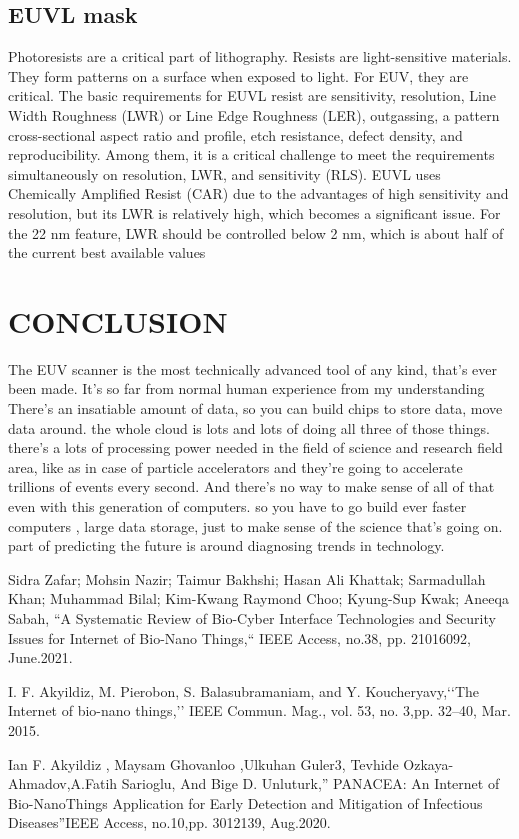 \documentclass[12pt,a4paper]{report}
\begin{document}
\section{EUVL mask}

Photoresists are a critical part of lithography. Resists are 
light-sensitive materials. 
They form patterns on a surface when exposed to light. For EUV, 
they are critical.
The basic requirements for EUVL resist are sensitivity, 
resolution, Line Width Roughness 
(LWR) or Line Edge Roughness (LER), outgassing, a pattern 
cross-sectional aspect ratio 
and profile, etch resistance, defect density, and 
reproducibility. Among them, 
it is a critical challenge to meet the requirements 
simultaneously on resolution, 
LWR, and sensitivity (RLS). EUVL uses Chemically Amplified 
Resist (CAR) due to 
the advantages of high sensitivity and resolution, but its 
LWR is relatively high, 
which becomes a significant issue. For the 22 nm feature, 
LWR should be 
controlled below 2 nm, which is about half of the current 
best available values



\chapter{CONCLUSION}
The EUV scanner is the most technically advanced tool of any kind, that's ever been made. It's so far from
normal human experience from my understanding
There's an insatiable amount of data, so you can build chips to store data, move data around. the whole cloud is lots
and lots of doing all three of those things. 
there's a lots of processing power needed in the field of science and research field area, like as in case 
of  particle
accelerators and they're going to accelerate trillions of events every second. And there's no way to make 
sense of all of that even with this generation of computers. so you have to go build ever faster computers
, large data storage, just to make sense of the science that's going on. part of predicting the future is around
diagnosing trends in technology.


\begin{thebibliography}{99}
 Sidra Zafar; Mohsin Nazir; Taimur Bakhshi; 
Hasan Ali Khattak; Sarmadullah Khan; Muhammad Bilal; 
Kim-Kwang Raymond Choo; Kyung-Sup Kwak; Aneeqa Sabah, 
“A Systematic Review of Bio-Cyber Interface Technologies 
and Security Issues for Internet of Bio-Nano Things,“ 
IEEE Access, no.38, pp. 21016092, June.2021.

I. F. Akyildiz, M. Pierobon, S. Balasubramaniam, 
and Y. Koucheryavy,‘‘The Internet of bio-nano things,’’ IEEE
 Commun. Mag., vol. 53, no. 3,pp. 32–40, Mar. 2015.

Ian F. Akyildiz , Maysam Ghovanloo ,Ulkuhan Guler3, Tevhide 
Ozkaya-Ahmadov,A.Fatih Sarioglu, And Bige D. Unluturk,” PANACEA: 
An Internet of Bio-NanoThings Application for Early Detection and 
Mitigation of Infectious Diseases”IEEE Access, no.10,pp. 3012139, Aug.2020.

\end{thebibliography}
\end{document}
